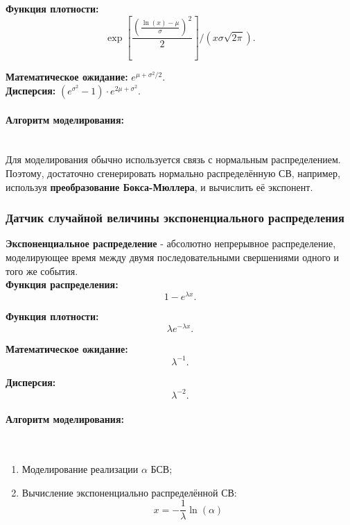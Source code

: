 \textbf{Функция плотности:}
\begin{equation}
	\exp\left[\frac{\left(\frac{\ln(x)-\mu}{\sigma}\right)^{2}}{2}\right]/\left(x\sigma\sqrt{2\pi}\right).
\end{equation}

\textbf{Математическое ожидание:} $e^{\mu+\sigma^{2}/2}$.\\

\textbf{Дисперсия:} $(e^{\sigma^{2}}-1)\cdot e^{2\mu+\sigma^{2}}$.

\paragraph{Алгоритм моделирования:}\
\\

Для моделирования обычно используется связь с нормальным распределением. Поэтому, достаточно сгенерировать нормально распределённую СВ, например, используя \textbf{преобразование Бокса-Мюллера}, и вычислить её экспонент.

\subsubsection{Датчик случайной величины экспоненциального распределения}

\textbf{Экспоненциальное распределение} - абсолютно непрерывное распределение, моделирующее время между двумя последовательными свершениями одного и того же события.\\

\textbf{Функция распределения:}
\begin{equation}
	1-e^{\lambda x}.
\end{equation}

\textbf{Функция плотности:}
\begin{equation}
	\lambda e^{-\lambda x}.
\end{equation}

\textbf{Математическое ожидание:}
\begin{equation}
	\lambda^{-1}.
\end{equation}

\textbf{Дисперсия:}
\begin{equation}
	\lambda^{-2}.
\end{equation}

\paragraph{Алгоритм моделирования:}\
\\

\begin{enumerate}
	\item Моделирование реализации $\alpha$ БСВ;
	\item Вычисление экспоненциально распределённой СВ:
	      \begin{equation}
		      x = -\frac{1}{\lambda}\ln(\alpha)
	      \end{equation}
\end{enumerate}
